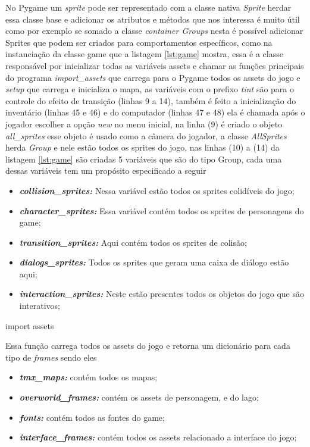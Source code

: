 \newpage

No Pygame um \textit{sprite} pode ser representado com a classe nativa \textit{Sprite} herdar essa classe base e adicionar os atributos e métodos que nos interessa é muito útil como por exemplo se somado a classe \textit{container Groups} nesta é possível adicionar Sprites que podem ser criados para comportamentos específicos, como na instanciação da classe game que a listagem \ref{lst:game} mostra, essa é a classe responsável por inicializar todas as variáveis assets e chamar as funções principais do programa \textit{import\_assets} que carrega para o Pygame todos os assets do jogo e \textit{setup} que carrega e inicializa o mapa, as variáveis com o prefixo \textit{tint} são para o controle do efeito de transição (linhas 9 a 14), também é feito a inicialização do inventário (linhas 45 e 46) e do computador (linhas 47 e 48)  ela é chamada após o jogador escolher a opção \textit{new} no menu inicial, na linha (9) é criado o objeto \textit{all\_sprites} esse objeto é usado como a câmera do jogador, a classe \textit{AllSprites} herda \textit{Group} e nele estão todos os sprites do jogo, nas linhas (10) a (14) da listagem \ref{lst:game} são criadas 5 variáveis que são do tipo Group, cada uma dessas variáveis tem um propósito especificado a seguir
\begin{itemize}
    \item \textit{\textbf{collision\_sprites: }}Nessa variável estão todos os sprites colidíveis do jogo;
    \item \textit{\textbf{character\_sprites: }}Essa variável contém todos os sprites de personagens do game;
    \item \textit{\textbf{transition\_sprites: }}Aqui contém todos os sprites de colisão;
    \item \textit{\textbf{dialogs\_sprites: }}Todos os sprites que geram uma caixa de diálogo estão aqui;
    \item \textit{\textbf{interaction\_sprites: }}Neste estão presentes todos os objetos do jogo que são interativos;
\end{itemize}

import assets

\newpage
Essa função carrega todos os assets do jogo e retorna um dicionário para cada tipo de \textit{frames} sendo eles
\begin{itemize}
    \item \textit{\textbf{tmx\_maps: }}contém todos os mapas;
    \item \textit{\textbf{overworld\_frames: }}contém os assets de personagem, e do lago;
    \item \textit{\textbf{fonts: }}contém todos as fontes do game;
    \item \textit{\textbf{interface\_frames: }}contém todos os assets relacionado a interface do jogo;
\end{itemize}


